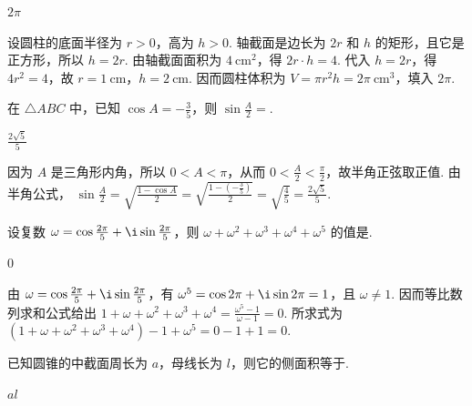 \begin{answer}
\(2\pi\)
\end{answer}

\begin{solution}
设圆柱的底面半径为 \(r>0\)，高为 \(h>0\). 轴截面是边长为 \(2r\) 和 \(h\) 的矩形，且它是正方形，所以 \(h=2r\). 由轴截面面积为 \(4\mathrm{~cm}^2\)，得 \(2r\cdot h=4\). 代入 \(h=2r\)，得 \(4r^2=4\)，故 \(r=1 \mathrm{~cm}\)，\(h=2 \mathrm{~cm}\). 因而圆柱体积为 \(V=\pi r^2h=2\pi \mathrm{~cm}^3\)，填入 \(2\pi\).
\end{solution}

\begin{problem}
在 \(\triangle ABC\) 中，已知 \(\cos A=-\frac{3}{5}\)，则 \(\sin\frac{A}{2}=\)\fillinblank{}.
\end{problem}

\begin{answer}
\(\frac{2\sqrt5}{5}\)
\end{answer}

\begin{solution}
因为 \(A\) 是三角形内角，所以 \(0<A<\pi\)，从而 \(0<\frac A2<\frac\pi2\)，故半角正弦取正值. 由半角公式，
\(\sin\frac A2=\sqrt{\frac{1-\cos A}{2}}=\sqrt{\frac{1-(-\frac35)}{2}}=\sqrt{\frac45}=\frac{2\sqrt5}{5}\).
\end{solution}

\begin{problem}
设复数 \(\omega=\cos\frac{2\pi}{5}+\i\sin\frac{2\pi}{5}\)，则 \(\omega+\omega^2+\omega^3+\omega^4+\omega^5\) 的值是\fillinblank{}.
\end{problem}

\begin{answer}
\(0\)
\end{answer}

\begin{solution}
由 \(\omega=\cos\frac{2\pi}{5}+\i\sin\frac{2\pi}{5}\)，有 \(\omega^5=\cos2\pi+\i\sin2\pi=1\)，且 \(\omega\ne1\). 因而等比数列求和公式给出
\(1+\omega+\omega^2+\omega^3+\omega^4=\frac{\omega^5-1}{\omega-1}=0\). 所求式为 \((1+\omega+\omega^2+\omega^3+\omega^4)-1+\omega^5=0-1+1=0\).
\end{solution}

\begin{problem}
已知圆锥的中截面周长为 \(a\)，母线长为 \(l\)，则它的侧面积等于\fillinblank{}.
\end{problem}

\begin{answer}
\(al\)
\end{answer}

